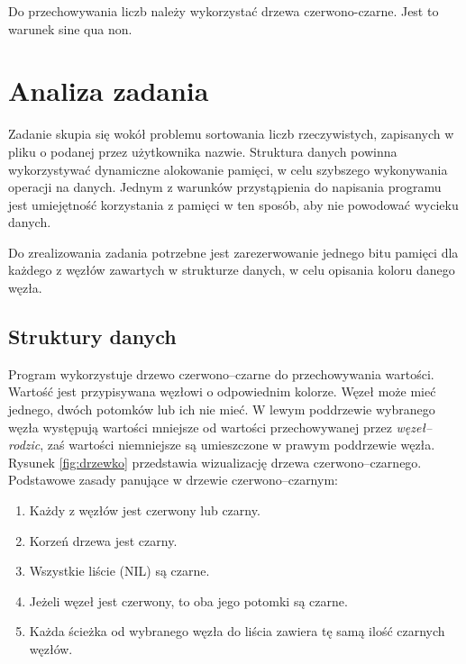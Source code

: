 \documentclass[12pt,a4paper,twoside]{article}
\begin{document}
Do przechowywania liczb należy wykorzystać drzewa czerwono-czarne. Jest to warunek sine qua non.\\


\section{Analiza zadania}

Zadanie skupia się wokół problemu sortowania liczb rzeczywistych, zapisanych w pliku o podanej przez użytkownika nazwie. Struktura danych powinna wykorzystywać dynamiczne alokowanie pamięci, w celu szybszego wykonywania operacji na danych. Jednym z warunków przystąpienia do napisania programu jest umiejętność korzystania z pamięci w ten sposób, aby nie powodować wycieku danych. 

Do zrealizowania zadania potrzebne jest zarezerwowanie jednego bitu pamięci dla każdego z węzłów zawartych w strukturze danych, w celu opisania koloru danego węzła.
	
\subsection{Struktury danych}

Program wykorzystuje drzewo czerwono–czarne do przechowywania wartości. Wartość jest przypisywana węzłowi o odpowiednim kolorze. Węzeł może mieć jednego, dwóch potomków lub ich nie mieć. W lewym poddrzewie wybranego węzła występują wartości mniejsze od wartości przechowywanej przez \emph{węzeł–rodzic}, zaś wartości niemniejsze są umieszczone w prawym poddrzewie węzła. Rysunek  \ref{fig:drzewko} przedstawia wizualizację drzewa czerwono–czarnego. \\

\noindent Podstawowe zasady panujące w drzewie czerwono–czarnym:~\cite{id:Cormen2009introductionToAlgorithms}
\begin{enumerate}
	\item{Każdy z węzłów jest czerwony lub czarny.}
	\item{Korzeń drzewa jest czarny.}
	\item{Wszystkie liście (NIL) są czarne.}
	\item{Jeżeli węzeł jest czerwony, to oba jego potomki są czarne.}
	\item{Każda ścieżka od wybranego węzła do liścia zawiera tę samą ilość czarnych węzłów.}	
\end{enumerate}
\label{zasady_drzewa}
\end{document}
